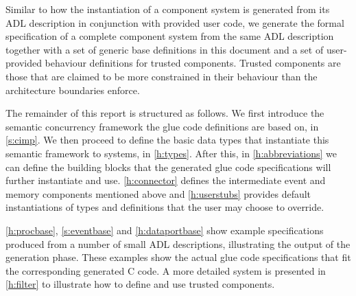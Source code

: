 Similar to how the instantiation of a component system is generated from its
ADL description in conjunction with provided user code, we generate
the formal specification of a complete \camkes component system from the same
ADL description together with a set of generic base definitions in this
document and a set of user-provided behaviour definitions for trusted
components. Trusted components are those that are claimed to be more
constrained in their behaviour than the architecture boundaries enforce.

The remainder of this report is structured as follows. We first introduce the
semantic concurrency framework the glue code definitions are based on, in
\autoref{s:cimp}. We then
proceed to define the basic data types that instantiate this semantic
framework to \camkes systems, in \autoref{h:types}. After this, in
\autoref{h:abbreviations} we can define
the building blocks
that the generated glue code specifications will further instantiate and use.
\autoref{h:connector} defines the intermediate event and memory components
mentioned above and \autoref{h:userstubs} provides default instantiations of
types and definitions that the user may choose to override.

\autoref{h:procbase}, \autoref{s:eventbase} and \autoref{h:dataportbase}
show example specifications produced from a number of small \camkes ADL
descriptions, illustrating the output of the generation phase. These examples
show the actual glue code specifications that fit the corresponding generated
C code. A more detailed system is presented in \autoref{h:filter} to
illustrate how to define and use trusted components.
